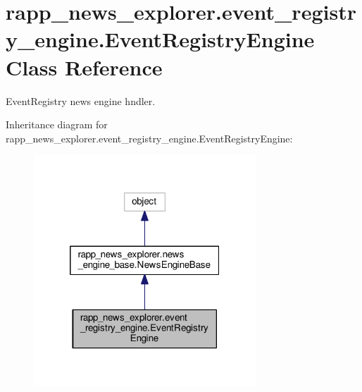 \hypertarget{classrapp__news__explorer_1_1event__registry__engine_1_1EventRegistryEngine}{\section{rapp\-\_\-news\-\_\-explorer.\-event\-\_\-registry\-\_\-engine.\-Event\-Registry\-Engine Class Reference}
\label{classrapp__news__explorer_1_1event__registry__engine_1_1EventRegistryEngine}
}


Event\-Registry news engine hndler.  




Inheritance diagram for rapp\-\_\-news\-\_\-explorer.\-event\-\_\-registry\-\_\-engine.\-Event\-Registry\-Engine\-:
\nopagebreak
\begin{figure}[H]
\begin{center}
\leavevmode
\includegraphics[width=236pt]{classrapp__news__explorer_1_1event__registry__engine_1_1EventRegistryEngine__inherit__graph}
\end{center}
\end{figure}


